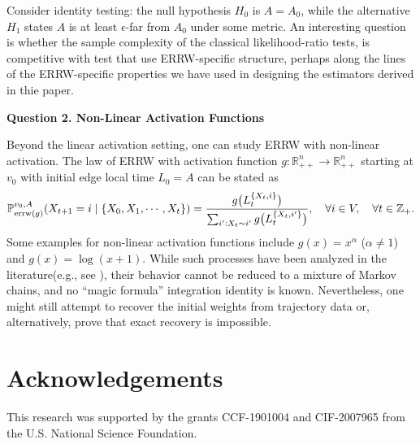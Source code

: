 \documentclass[a4paper, 11pt]{article}
\renewcommand{\P}{\mathbb{P}}
\begin{document}
Consider identity testing: the null hypothesis $H_0$ is $A = A_0$, while the alternative $H_1$ states $A$ is at least $\epsilon$-far from $A_0$ under some metric. An interesting question is whether the sample complexity of the classical likelihood-ratio tests,
is competitive with test that use ERRW-specific structure, perhaps along the lines of the ERRW-specific properties we have used in designing the estimators derived in thie paper.


\textbf{Question 2. Non-Linear Activation Functions}

Beyond the linear activation setting, one can study ERRW with non-linear activation. The law of ERRW with activation function $g:\mathbb{R}_{++}^n\rightarrow\mathbb{R}_{++}^n$ starting at $v_0$ with initial edge local time $L_0=A$ can be stated as
\[
\P_{\textnormal{errw}(g)}^{v_0,A}(X_{t+1}=i \mid \{X_0,X_1,\cdots, X_t\}) = \frac{g\big(L_t^{\{X_t, i\}}\big)}{\sum_{i':X_t \sim i'} g\big(L_t^{\{X_t, i'\}}\big)}, \quad \forall i\in V,
\quad \forall t \in \mathbb{Z}_+.
\]
Some examples for non-linear activation functions include $g(x) = x^\alpha$ ($\alpha \neq 1$) and $g(x) = \log(x+1)$. While such processes have been analyzed in the literature(e.g., see \cite{lt, ct}), their behavior cannot be reduced to a mixture of Markov chains, and no ``magic formula'' integration identity is known. Nevertheless, one might still attempt to recover the initial weights from trajectory data or, alternatively, prove that exact recovery is impossible.



\section*{Acknowledgements}

This research was supported by the grants
CCF-1901004 and CIF-2007965 from the U.S. National Science Foundation.
\end{document}
